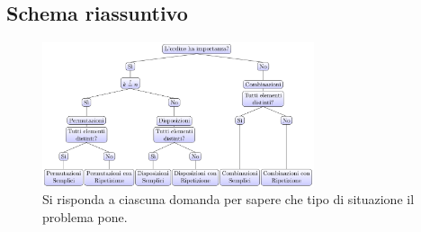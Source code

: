 \subsection{Schema riassuntivo}
\begin{figure}[h]
	\centering
	\includegraphics[width=8cm]{image/tree}
	\caption{Si risponda a ciascuna domanda per sapere che tipo di situazione il problema pone.}
\end{figure}
